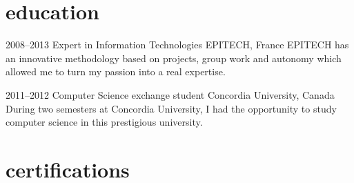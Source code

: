\documentclass[]{cv-a4}
\begin{document}

\section{education}

\begin{entrylist}


\entry
{2008--2013}
{Expert {\normalfont in Information Technologies}}
{EPITECH, France}
{EPITECH has an innovative methodology based on projects, group work and autonomy which allowed me to turn my passion into a real expertise.}


\entry
{2011--2012}
{Computer Science {\normalfont exchange student}}
{Concordia University, Canada}
{During two semesters at Concordia University, I had the opportunity to study computer science in this prestigious university.}


\end{entrylist}


\section{certifications}
\end{document}
